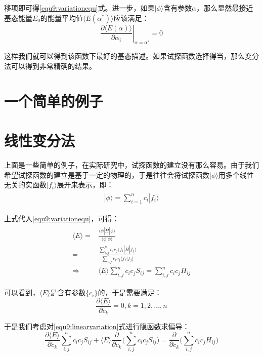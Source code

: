 移项即可得\ref{equ9:variationequ}式。进一步，如果$|\phi\rangle$含有参数$\alpha$，那么显然最接近基态能量$E_0$的能量平均值$\langle E(\alpha^*)\rangle$应该满足：
\begin{equation}
    \left.\frac{\partial \langle E(\alpha)\rangle}{\partial \alpha_i}\right|_{\alpha=\alpha^*}=0
\end{equation}

这样我们就可以得到该函数下最好的基态描述。如果试探函数选择得当，那么变分法可以得到非常精确的结果。
\section{一个简单的例子}

\section{线性变分法}
上面是一些简单的例子，在实际研究中，试探函数的建立没有那么容易。由于我们希望试探函数的建立是基于一定的物理的，于是往往会将试探函数$|\phi\rangle$用多个线性无关的实函数$|f_i\rangle$展开来表示，即：
\begin{align}
    \begin{split}
        |\phi\rangle=\sum_{i=1}^n c_i|f_i\rangle
    \end{split}
\end{align}

上式代入\ref{equ9:variationequ}，可得：
\begin{align}\label{equ9:linearvariation}
    \begin{split}
        \langle E\rangle=&\frac{\langle\phi|\hat{H}|\phi\rangle}{\langle\phi|\phi\rangle}\\
        =&\frac{\sum_{i,j}^nc_ic_j\langle f_i|\hat{H}|f_j\rangle}{\sum_{i,j}^n c_ic_j\langle f_i|f_j\rangle}\\
        \Rightarrow&\langle E\rangle\sum_{i,j}^n c_ic_jS_{ij}=\sum_{i,j}^n c_ic_jH_{ij}
    \end{split}
\end{align}

可以看到，$\langle E\rangle$是含有参数$\{c_i\}$的，于是需要满足：
\begin{equation}
    \frac{\partial \langle E\rangle}{\partial c_k}=0,k=1,2,\dots,n
\end{equation}

于是我们考虑对\ref{equ9:linearvariation}式进行隐函数求偏导：
\begin{equation}\label{equ9:A}
     \frac{\partial\langle E\rangle}{\partial c_k}\sum_{i,j}^n c_ic_jS_{ij}+\langle E\rangle\frac{\partial}{\partial c_k}\Big(\sum_{i,j}^n c_ic_jS_{ij}\Big)=\frac{\partial}{\partial c_k}\Big(\sum_{i,j}^n c_ic_jH_{ij}\Big)
\end{equation}

